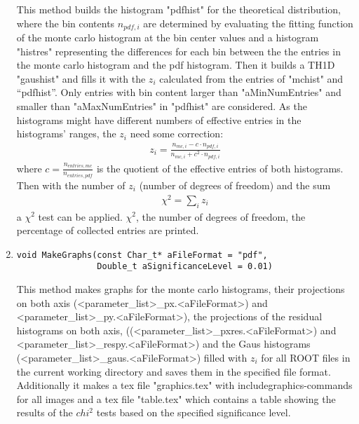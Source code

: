 \begin{enumerate}
\begin{verbatim}
\end{verbatim}
This method builds the histogram "pdfhist" for the theoretical distribution, where the bin contents $n_{pdf,i}$ are determined by evaluating the fitting function of the monte carlo histogram at the bin center values and a histogram "histres" representing the differences for each bin between the the entries in the monte carlo histogram and the pdf histogram. Then it builds a TH1D "gaushist" and fills it with the $z_i$ calculated from the entries of "mchist" and "`pdfhist"'. Only entries with bin content larger than "aMinNumEntries" and smaller than "aMaxNumEntries" in "pdfhist" are considered. As the histograms might have different numbers of effective entries in the histograms' ranges, the $z_i$ need some correction:
\begin{gather}
z_i = \frac{n_{mc,i} - c \cdot n_{pdf,i}}{n_{mc,i} + c^2 \cdot n_{pdf,i}}
\end{gather} 
where $c = \frac{n_{entries,mc}}{n_{entries,pdf}}$ is the quotient of the effective entries of both histograms.
Then with the number of $z_i$ (number of degrees of freedom) and the sum
\begin{gather}
\chi^2 = \sum_i z_i
\end{gather}
a $\chi^2$ test can be applied.
$\chi^2$, the number of degrees of freedom, the percentage of collected entries
are printed. 
\item
\begin{verbatim}
void MakeGraphs(const Char_t* aFileFormat = "pdf",
                Double_t aSignificanceLevel = 0.01)
\end{verbatim}
This method makes graphs for the monte carlo histograms, their projections on both axis (<parameter\_list>\_px.<aFileFormat>) and <parameter\_list>\_py.<aFileFormat>), the projections of the residual histograms on both axis, ((<parameter\_list>\_pxres.<aFileFormat>) and <parameter\_list>\_respy.<aFileFormat>)
and the Gaus histograms (<parameter\_list>\_gaus.<aFileFormat>) filled with $z_i$ for all ROOT files in the current working directory and saves them in the specified file format. \\
Additionally it makes a tex file "graphics.tex" with includegraphics-commands for all images and a tex file "table.tex" which contains a table showing the results of the $chi^2$ tests based on the specified significance level.
\end{enumerate}